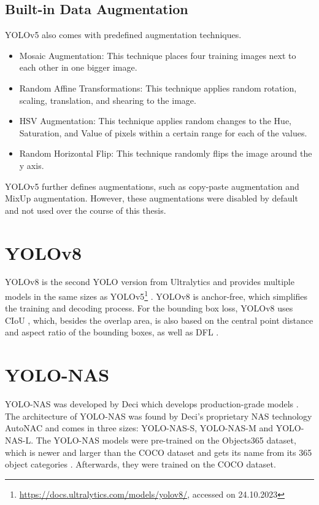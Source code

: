 \documentclass[10pt]{book}
\begin{document}
\subsection{Built-in Data Augmentation}

\ac{YOLO}v5 also comes with predefined augmentation techniques. 

\begin{itemize}
  \item Mosaic Augmentation: This technique places four training images next to each other in one bigger image.
  \item Random Affine Transformations: This technique applies random rotation, scaling, translation, and shearing to the image.
  \item HSV Augmentation: This technique applies random changes to the Hue, Saturation, and Value of pixels within a certain range for each of the values.
  \item Random Horizontal Flip: This technique randomly flips the image around the y axis.
\end{itemize}

\ac{YOLO}v5 further defines augmentations, such as copy-paste augmentation and MixUp augmentation. However, these augmentations were disabled by default and not used over the course of this thesis.

\section{YOLOv8}

\ac{YOLO}v8 is the second \ac{YOLO} version from Ultralytics and provides multiple models in the same sizes as \ac{YOLO}v5\footnote{\url{https://docs.ultralytics.com/models/yolov8/}, accessed on 24.10.2023} \cite{terven2023comprehensive}. \ac{YOLO}v8 is anchor-free, which simplifies the training and decoding process. For the bounding box loss, \ac{YOLO}v8 uses \ac{CIoU} \cite{zheng2020distance}, which, besides the overlap area, is also based on the central point distance and aspect ratio of the bounding boxes, as well as \ac{DFL} \cite{li2020generalized}. %

\section{YOLO-NAS}

\ac{YOLO}-NAS was developed by Deci which develops production-grade models \cite{terven2023comprehensive}. The architecture of \ac{YOLO}-NAS was found by Deci's proprietary \ac{NAS} technology AutoNAC and comes in three sizes: \ac{YOLO}-NAS-S, \ac{YOLO}-NAS-M and \ac{YOLO}-NAS-L. The \ac{YOLO}-NAS models were pre-trained on the Objects365 dataset, which is newer and larger than the \ac{COCO} dataset and gets its name from its 365 object categories \cite{shao2019objects365}. Afterwards, they were trained on the \ac{COCO} dataset.
\end{document}
